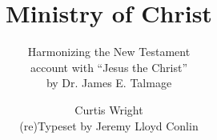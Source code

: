 \documentclass[8pt]{scrartcl}
\title{Ministry of Christ}
\subtitle{Harmonizing the New Testament\\ account with ``Jesus the Christ''\\ by Dr. James E. Talmage}
\author{\Huge Curtis Wright\\\small (re)Typeset by Jeremy Lloyd Conlin}
\date{}
\begin{document}
\pagestyle{empty}
\maketitle


\begin{landscape}

\end{landscape}
\end{document}
